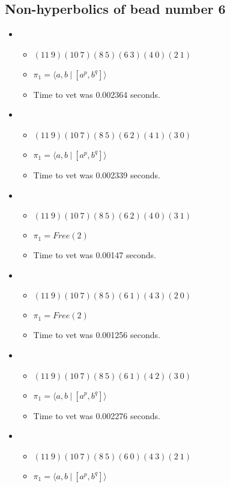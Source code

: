 \documentclass{article}
\begin{document}
\subsection{Non-hyperbolics of bead number 6}
\begin{itemize}
\item \begin{itemize}
      \item $(11\ 9)(10\ 7)(8\ 5)(6\ 3)(4\ 0)(2\ 1)$
      \item $\pi_1 = \langle a,b\ |\ [a^p,b^q]\rangle$
      \item Time to vet was 0.002364 seconds.
\end{itemize}
\item \begin{itemize}
      \item $(11\ 9)(10\ 7)(8\ 5)(6\ 2)(4\ 1)(3\ 0)$
      \item $\pi_1 = \langle a,b\ |\ [a^p,b^q]\rangle$
      \item Time to vet was 0.002339 seconds.
\end{itemize}
\item \begin{itemize}
      \item $(11\ 9)(10\ 7)(8\ 5)(6\ 2)(4\ 0)(3\ 1)$
      \item $\pi_1 =Free(2)$
      \item Time to vet was 0.00147 seconds.
\end{itemize}
\item \begin{itemize}
      \item $(11\ 9)(10\ 7)(8\ 5)(6\ 1)(4\ 3)(2\ 0)$
      \item $\pi_1 =Free(2)$
      \item Time to vet was 0.001256 seconds.
\end{itemize}
\item \begin{itemize}
      \item $(11\ 9)(10\ 7)(8\ 5)(6\ 1)(4\ 2)(3\ 0)$
      \item $\pi_1 = \langle a,b\ |\ [a^p,b^q]\rangle$
      \item Time to vet was 0.002276 seconds.
\end{itemize}
\item \begin{itemize}
      \item $(11\ 9)(10\ 7)(8\ 5)(6\ 0)(4\ 3)(2\ 1)$
      \item $\pi_1 = \langle a,b\ |\ [a^p,b^q]\rangle$

\end{itemize}
\end{itemize}
\end{document}
